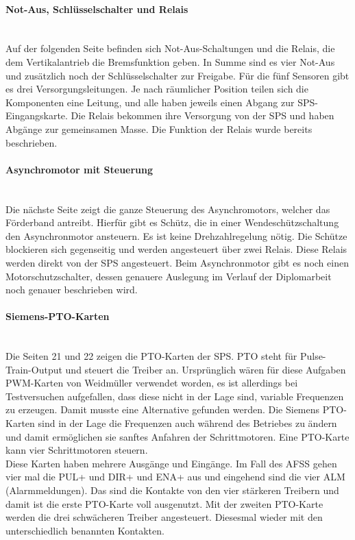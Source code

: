     \paragraph{Not-Aus, Schlüsselschalter und Relais}\mbox{}\\
    Auf der folgenden Seite befinden sich Not-Aus-Schaltungen und die Relais, die dem Vertikalantrieb die Bremsfunktion geben. In Summe sind es vier Not-Aus und zusätzlich noch der Schlüsselschalter zur Freigabe. Für die fünf Sensoren gibt es drei Versorgungsleitungen. Je nach räumlicher Position teilen sich die Komponenten eine Leitung, und alle haben jeweils einen Abgang zur SPS-Eingangskarte. Die Relais bekommen ihre Versorgung von der SPS und haben Abgänge zur gemeinsamen Masse. Die Funktion der Relais wurde bereits beschrieben.
    \paragraph{Asynchromotor mit Steuerung}\mbox{}\\
    Die nächste Seite zeigt die ganze Steuerung des Asynchromotors, welcher das Förderband antreibt. Hierfür gibt es Schütz, die in einer Wendeschützschaltung den Asynchronmotor ansteuern. Es ist keine Drehzahlregelung nötig. Die Schütze blockieren sich gegenseitig und werden angesteuert über zwei Relais. Diese Relais werden direkt von der SPS angesteuert. Beim Asynchronmotor gibt es noch einen Motorschutzschalter, dessen genauere Auslegung im Verlauf der Diplomarbeit noch genauer beschrieben wird.
    \paragraph{Siemens-PTO-Karten}\mbox{}\\
    Die Seiten 21 und 22 zeigen die PTO-Karten der SPS. PTO steht für Pulse-Train-Output und steuert die Treiber an. Ursprünglich wären für diese Aufgaben PWM-Karten von Weidmüller verwendet worden, es ist allerdings bei Testversuchen aufgefallen, dass diese nicht in der Lage sind, variable Frequenzen zu erzeugen. Damit musste eine Alternative gefunden werden. Die Siemens PTO-Karten sind in der Lage die Frequenzen auch während des Betriebes zu ändern und damit ermöglichen sie sanftes Anfahren der Schrittmotoren. Eine PTO-Karte kann vier Schrittmotoren steuern.\\
    Diese Karten haben mehrere Ausgänge und Eingänge. Im Fall des AFSS gehen vier mal die PUL+ und DIR+ und ENA+ aus und eingehend sind die vier ALM (Alarmmeldungen). Das sind die Kontakte von den vier stärkeren Treibern und damit ist die erste PTO-Karte voll ausgenutzt. Mit der zweiten PTO-Karte werden die drei schwächeren Treiber angesteuert. Diesesmal wieder mit den unterschiedlich benannten Kontakten.
